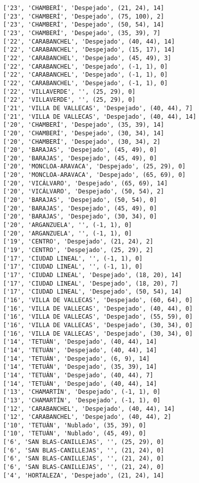 \documentclass[11pt]{article}
\begin{document}
\begin{Verbatim}[commandchars=\\\{\}]
['23', 'CHAMBERÍ', 'Despejado', (21, 24), 14]
['23', 'CHAMBERÍ', 'Despejado', (75, 100), 2]
['23', 'CHAMBERÍ', 'Despejado', (50, 54), 14]
['23', 'CHAMBERÍ', 'Despejado', (35, 39), 7]
['22', 'CARABANCHEL', 'Despejado', (40, 44), 14]
['22', 'CARABANCHEL', 'Despejado', (15, 17), 14]
['22', 'CARABANCHEL', 'Despejado', (45, 49), 3]
['22', 'CARABANCHEL', 'Despejado', (-1, 1), 0]
['22', 'CARABANCHEL', 'Despejado', (-1, 1), 0]
['22', 'CARABANCHEL', 'Despejado', (-1, 1), 0]
['22', 'VILLAVERDE', '', (25, 29), 0]
['22', 'VILLAVERDE', '', (25, 29), 0]
['21', 'VILLA DE VALLECAS', 'Despejado', (40, 44), 7]
['21', 'VILLA DE VALLECAS', 'Despejado', (40, 44), 14]
['20', 'CHAMBERÍ', 'Despejado', (35, 39), 14]
['20', 'CHAMBERÍ', 'Despejado', (30, 34), 14]
['20', 'CHAMBERÍ', 'Despejado', (30, 34), 2]
['20', 'BARAJAS', 'Despejado', (45, 49), 0]
['20', 'BARAJAS', 'Despejado', (45, 49), 0]
['20', 'MONCLOA-ARAVACA', 'Despejado', (25, 29), 0]
['20', 'MONCLOA-ARAVACA', 'Despejado', (65, 69), 0]
['20', 'VICÁLVARO', 'Despejado', (65, 69), 14]
['20', 'VICÁLVARO', 'Despejado', (50, 54), 2]
['20', 'BARAJAS', 'Despejado', (50, 54), 0]
['20', 'BARAJAS', 'Despejado', (45, 49), 0]
['20', 'BARAJAS', 'Despejado', (30, 34), 0]
['20', 'ARGANZUELA', '', (-1, 1), 0]
['20', 'ARGANZUELA', '', (-1, 1), 0]
['19', 'CENTRO', 'Despejado', (21, 24), 2]
['19', 'CENTRO', 'Despejado', (25, 29), 2]
['17', 'CIUDAD LINEAL', '', (-1, 1), 0]
['17', 'CIUDAD LINEAL', '', (-1, 1), 0]
['17', 'CIUDAD LINEAL', 'Despejado', (18, 20), 14]
['17', 'CIUDAD LINEAL', 'Despejado', (18, 20), 7]
['17', 'CIUDAD LINEAL', 'Despejado', (50, 54), 14]
['16', 'VILLA DE VALLECAS', 'Despejado', (60, 64), 0]
['16', 'VILLA DE VALLECAS', 'Despejado', (40, 44), 0]
['16', 'VILLA DE VALLECAS', 'Despejado', (55, 59), 0]
['16', 'VILLA DE VALLECAS', 'Despejado', (30, 34), 0]
['16', 'VILLA DE VALLECAS', 'Despejado', (30, 34), 0]
['14', 'TETUÁN', 'Despejado', (40, 44), 14]
['14', 'TETUÁN', 'Despejado', (40, 44), 14]
['14', 'TETUÁN', 'Despejado', (6, 9), 14]
['14', 'TETUÁN', 'Despejado', (35, 39), 14]
['14', 'TETUÁN', 'Despejado', (40, 44), 7]
['14', 'TETUÁN', 'Despejado', (40, 44), 14]
['13', 'CHAMARTÍN', 'Despejado', (-1, 1), 0]
['13', 'CHAMARTÍN', 'Despejado', (-1, 1), 0]
['12', 'CARABANCHEL', 'Despejado', (40, 44), 14]
['12', 'CARABANCHEL', 'Despejado', (40, 44), 2]
['10', 'TETUÁN', 'Nublado', (35, 39), 0]
['10', 'TETUÁN', 'Nublado', (45, 49), 0]
['6', 'SAN BLAS-CANILLEJAS', '', (25, 29), 0]
['6', 'SAN BLAS-CANILLEJAS', '', (21, 24), 0]
['6', 'SAN BLAS-CANILLEJAS', '', (21, 24), 0]
['6', 'SAN BLAS-CANILLEJAS', '', (21, 24), 0]
['4', 'HORTALEZA', 'Despejado', (21, 24), 14]

\end{Verbatim}
\end{document}
